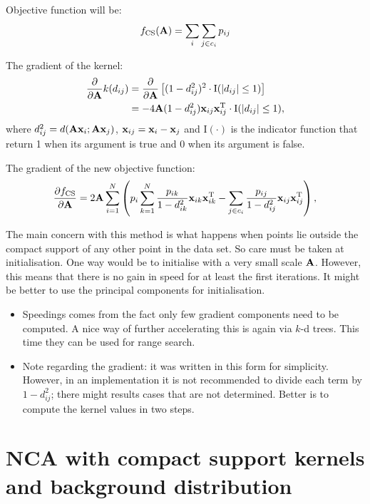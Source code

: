 Objective function will be: 
\begin{align}
	f_\text{CS}(\mathbf{A}) = \sum_{i}\sum_{j\in c_i} p_{ij}
\end{align}

The gradient of the kernel:
\begin{align}
	\frac{\partial}{\partial\mathbf{A}}k(d_{ij}) 
	&= 	\frac{\partial}{\partial\mathbf{A}}\left[(1-d_{ij}^2)^2\cdot\mathrm{I}(\left|d_{ij}\right|\le 1)\right]\\
	&= -4\mathbf{A}(1-d_{ij}^2)  \mathbf{x}_{ij} \mathbf{x}_{ij}^\mathrm{T} \cdot \mathrm{I}(\left|d_{ij}\right|\le 1),
\end{align}
where $d_{ij}^2 = d(\mathbf{A}\mathbf{x}_i;\mathbf{A}\mathbf{x}_j)$, $\mathbf{x}_{ij}=\mathbf{x}_i-\mathbf{x}_j$ and $\mathrm{I}(\cdot)$ is the indicator function that return 1 when its argument is true and 0 when its argument is false.

The gradient of the new objective function:
\begin{align}
	\frac{\partial f_\text{CS}}{\partial \mathbf{A}}=2\mathbf{A}\sum_{i=1}^{N}
	\left(
	p_i \sum_{k=1}^N \frac{p_{ik}}{1-d_{ik}^2} \mathbf{x}_{ik}\mathbf{x}_{ik}^{\textrm{T}}
	- \sum_{j\in c_i} \frac{p_{ij}}{1-d_{ij}^2}\mathbf{x}_{ij}\mathbf{x}_{ij}^{\textrm{T}} 
	\right)
	\label{eq:nca-cs-grad},
\end{align}

The main concern with this method is what happens when points lie outside the compact support of any other point in the data set. So care must be taken at initialisation. One way would be to initialise with a very small scale $\mathbf{A}$. However, this means that there is no gain in speed for at least the first iterations. It might be better to use the principal components for initialisation. 

\begin{itemize}
	\item Speedings comes from the fact only few gradient components need to be computed. A nice way of further accelerating this is again via $k$-d trees. This time they can be used for range search. 
	\item Note regarding the gradient: it was written in this form for simplicity. However, in an implementation it is not recommended to divide each term by $1-d_{ij}^2$; there might results cases that are not determined. Better is to compute the kernel values in two steps.
\end{itemize}

\section{NCA with compact support kernels and background distribution}
\label{sec:nca-cs-back}


